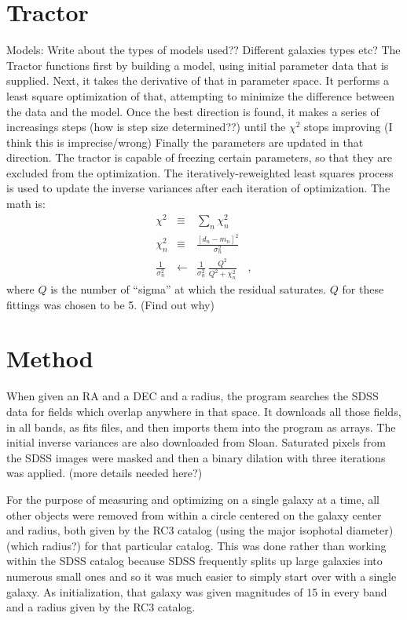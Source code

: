 \documentclass[12pt,preprint,pdftex]{aastex}
\begin{document}
\section{Tractor}
Models: Write about the types of models used?? Different galaxies types etc?
The Tractor functions first by building a model, using initial parameter data that is supplied. Next, it takes the derivative of that in parameter space. It performs a least square optimization of that, attempting to minimize the difference between the data and the model. Once the best direction is found, it makes a series of increasings steps (how is step size determined??) until the $\chi^2$ stops improving (I think this is imprecise/wrong) Finally the parameters are updated in that direction. The tractor is capable of freezing certain parameters, so that they are excluded from the optimization. 
The iteratively-reweighted least squares process is used to update the
inverse variances after each iteration of optimization. The math is:
\begin{eqnarray}
\chi^2 &\equiv& \sum_n \chi_n^2
\\
\chi_n^2 &\equiv& \frac{[d_n - m_n]^2}{\sigma_n^2}
\\
\frac{1}{\sigma_n^2} &\leftarrow& \frac{1}{\sigma_n^2}\,\frac{Q^2}{Q^2+\chi_n^2}
\quad ,
\end{eqnarray}
where $Q$ is the number of ``sigma'' at which the residual saturates. $Q$ for these fittings was chosen to be 5. (Find out why)

\section{Method}
When given an RA and a DEC and a radius, the program searches the SDSS data for fields which overlap anywhere in that space. It downloads all those fields, in all bands, as fits files, and then imports them into the program as arrays. The initial inverse variances are also downloaded from Sloan.
Saturated pixels from the SDSS images were masked and then a binary dilation with three iterations was applied. (more details needed here?)

For the purpose of measuring and optimizing on a single galaxy at a
time, all other objects were removed from within a circle centered on
the galaxy center and radius, both given by the RC3 catalog (using the major isophotal diameter)
(which radius?) for that particular catalog. This was done rather than
working within the SDSS catalog because SDSS frequently splits up large
galaxies into numerous small ones and so it was much easier to simply
start over with a single galaxy. As initialization, that galaxy was
given magnitudes of 15 in every band and a radius given by the RC3
catalog.
\end{document}
